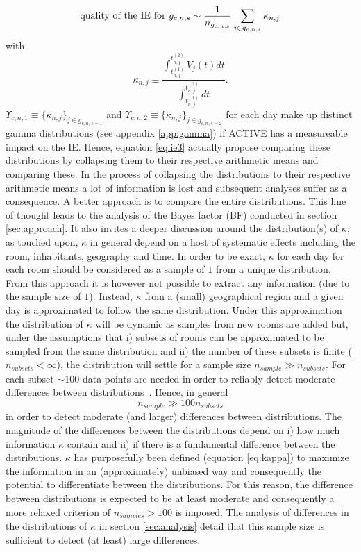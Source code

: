 \documentclass[fleqn,usenatbib,nofootinbib]{revtex4-2}
\begin{document}
	\begin{equation}
		\text{\rm quality of the IE for $g_{c,n,s}$} \sim \frac{1}{n_{g_{c,n,s}}}\sum_{j\in g_{c,n,s}}\kappa_{n,j}
		\label{eq:ie3}
	\end{equation}
	with
	\begin{equation}
		\kappa_{n,j}\equiv \frac{\int_{t_{n,j}^{(1)}}^{t_{n,j}^{(2)}}V_{j}(t)dt}{\int_{t_{n,j}^{(1)}}^{t_{n,j}^{(2)}}dt}.
		\label{eq:kappa}
	\end{equation}
	$\Upsilon_{c,n,1} \equiv  \{\kappa_{n,j}\}_{j\in g_{c,n,s=1}}$ and $\Upsilon_{c,n,2} \equiv \{\kappa_{n,j}\}_{j\in g_{c,n,s=2}}$ for each day make up distinct gamma distributions (see appendix \ref{app:gamma}) if ACTIVE has a measureable impact on the IE. Hence, equation \eqref{eq:ie3} actually propose comparing these distributions by collapsing them to their respective arithmetic means and comparing these. In the process of collapsing the distributions to their respective arithmetic means a lot of information is lost and subsequent analyses suffer as a consequence. A better approach is to compare the entire distributions. This line of thought leads to the analysis of the Bayes factor (BF) conducted in section \ref{sec:approach}. It also invites a deeper discussion around the distribution(s) of $\kappa$; as touched upon, $\kappa$ in general depend on a host of systematic effects including the room, inhabitants, geography and time. In order to be exact, $\kappa$ for each day for each room should be considered as a sample of $1$ from a unique distribution. From this approach it is however not possible to extract any information (due to the sample size of $1$). Instead, $\kappa$ from a (small) geographical region and a given day is approximated to follow the same distribution. Under this approximation the distribution of $\kappa$ will be dynamic as samples from new rooms are added but, under the assumptions that i) subsets of rooms can be approximated to be sampled from the same distribution and ii) the number of these subsets is finite ($n_{subsets}<\infty$), the distribution will settle for a sample size $n_{sample}\gg n_{subsets}$. For each subset $\sim100$ data points are needed in order to reliably detect moderate differences between distributions~\citep{kelter2020}. Hence, in general
	\begin{equation}
		n_{sample}\gg  100n_{subsets}
		\label{eq:crit}
	\end{equation}
	in order to detect moderate (and larger) differences between distributions. The magnitude of the differences between the distributions depend on i) how much information $\kappa$ contain and ii) if there is a fundamental difference between the distributions. $\kappa$ has purposefully been defined (equation \eqref{eq:kappa}) to maximize the information in an (approximately) unbiased way and consequently the potential to differentiate between the distributions. For this reason, the difference between distributions is expected to be at least moderate and consequently a more relaxed criterion of $n_{samples}>100$ is imposed. The analysis of differences in the distributions of $\kappa$ in section \ref{sec:analysis} detail that this sample size is sufficient to detect (at least) large differences. 
	
\end{document}
